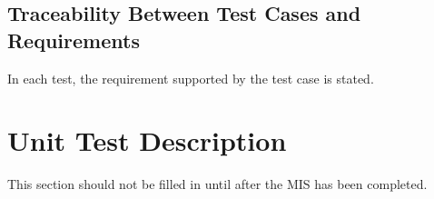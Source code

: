 \documentclass[12pt, titlepage]{article}
\begin{document}
% 
% 
% 
% 		
% 
% 
% 
% 					
% 					
% 					
% 					
% 					
% 
% 					
% 					
% 					
% 					
% 
% 
% 

\subsection{Traceability Between Test Cases and Requirements}

In each test, the requirement supported by the test case is stated.

\section{Unit Test Description}

This section should not be filled in until after the MIS has been completed.
\end{document}
